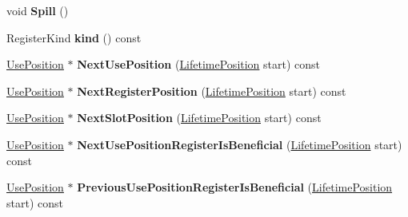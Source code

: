 \begin{DoxyCompactItemize}
\item 
void {\bfseries Spill} ()\hypertarget{classv8_1_1internal_1_1compiler_1_1_live_range_a89df2239ef516ac0f434db1f292bd59e}{}\label{classv8_1_1internal_1_1compiler_1_1_live_range_a89df2239ef516ac0f434db1f292bd59e}

\item 
Register\+Kind {\bfseries kind} () const \hypertarget{classv8_1_1internal_1_1compiler_1_1_live_range_a3fcdef12d9508d975f5276cc93c07727}{}\label{classv8_1_1internal_1_1compiler_1_1_live_range_a3fcdef12d9508d975f5276cc93c07727}

\item 
\hyperlink{classv8_1_1internal_1_1compiler_1_1_use_position}{Use\+Position} $\ast$ {\bfseries Next\+Use\+Position} (\hyperlink{classv8_1_1internal_1_1compiler_1_1_lifetime_position}{Lifetime\+Position} start) const \hypertarget{classv8_1_1internal_1_1compiler_1_1_live_range_aca4ca1412ece8036523acfa47c64eb9a}{}\label{classv8_1_1internal_1_1compiler_1_1_live_range_aca4ca1412ece8036523acfa47c64eb9a}

\item 
\hyperlink{classv8_1_1internal_1_1compiler_1_1_use_position}{Use\+Position} $\ast$ {\bfseries Next\+Register\+Position} (\hyperlink{classv8_1_1internal_1_1compiler_1_1_lifetime_position}{Lifetime\+Position} start) const \hypertarget{classv8_1_1internal_1_1compiler_1_1_live_range_aa95717941a59e5d43f347e1ecb3ae06e}{}\label{classv8_1_1internal_1_1compiler_1_1_live_range_aa95717941a59e5d43f347e1ecb3ae06e}

\item 
\hyperlink{classv8_1_1internal_1_1compiler_1_1_use_position}{Use\+Position} $\ast$ {\bfseries Next\+Slot\+Position} (\hyperlink{classv8_1_1internal_1_1compiler_1_1_lifetime_position}{Lifetime\+Position} start) const \hypertarget{classv8_1_1internal_1_1compiler_1_1_live_range_a6c90a72d63d2a523309ad95af7d47797}{}\label{classv8_1_1internal_1_1compiler_1_1_live_range_a6c90a72d63d2a523309ad95af7d47797}

\item 
\hyperlink{classv8_1_1internal_1_1compiler_1_1_use_position}{Use\+Position} $\ast$ {\bfseries Next\+Use\+Position\+Register\+Is\+Beneficial} (\hyperlink{classv8_1_1internal_1_1compiler_1_1_lifetime_position}{Lifetime\+Position} start) const \hypertarget{classv8_1_1internal_1_1compiler_1_1_live_range_a8662d1fc028e402d0e249c6bf9adf460}{}\label{classv8_1_1internal_1_1compiler_1_1_live_range_a8662d1fc028e402d0e249c6bf9adf460}

\item 
\hyperlink{classv8_1_1internal_1_1compiler_1_1_use_position}{Use\+Position} $\ast$ {\bfseries Previous\+Use\+Position\+Register\+Is\+Beneficial} (\hyperlink{classv8_1_1internal_1_1compiler_1_1_lifetime_position}{Lifetime\+Position} start) const \hypertarget{classv8_1_1internal_1_1compiler_1_1_live_range_aad22218b0bebdcbd0f7418ff36e06f6b}{}\label{classv8_1_1internal_1_1compiler_1_1_live_range_aad22218b0bebdcbd0f7418ff36e06f6b}


\end{DoxyCompactItemize}
